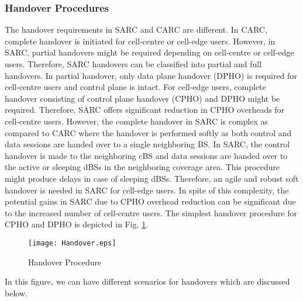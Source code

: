\documentclass[article,10pt,twocolumn]{IEEEtran}
\begin{document}
\subsubsection{Handover Procedures}\label{MM:ho_proc}
The handover requirements in SARC and CARC are different. In CARC, complete handover is initiated for cell-centre or cell-edge users. However, in SARC, partial handovers might be required depending on cell-centre or cell-edge users. Therefore, SARC handovers can be classified into partial and full handovers. In partial handover, only data plane handover (DPHO) is required for cell-centre users and control plane is intact. For cell-edge users, complete handover consisting of control plane handover (CPHO) and DPHO might be required. Therefore, SARC offers significant reduction in CPHO overheads for cell-centre users. However, the complete handover in SARC is complex as compared to CARC where the handover is performed softly as both control and data sessions are handed over to a single neighboring BS. In SARC, the control handover is made to the neighboring cBS and data sessions are handed over to the active or sleeping dBSs in the neighboring coverage area. This procedure might produce delays in case of sleeping dBSs. Therefore, an agile and robust soft handover is needed in SARC for cell-edge users. In spite of this complexity, the potential gains in SARC due to CPHO overhead reduction can be significant due to the increased number of cell-centre users. The simplest handover procedure for CPHO and DPHO is depicted in Fig. \ref{Figure:ho}.
\begin{figure}[h]
\centering
  \texttt{[image: Handover.eps]}
  \caption{Handover Procedure}\label{Figure:ho}
\vspace{-2mm}
\end{figure}
In this figure, we can have different scenarios for handovers which are discussed below.
\end{document}
